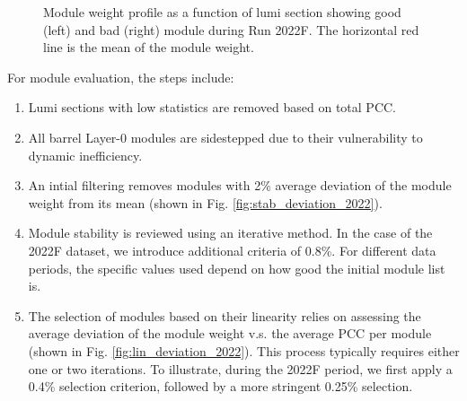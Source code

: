 \begin{figure}[ht]
\begin{subfigure}{0.49\textwidth}
  \label{fig:sub2}
\end{subfigure}
\caption[Good/Bad Module Weight Profile]{Module weight profile as a function of lumi section showing good (left) and bad (right) module during Run 2022F. The horizontal red line is the mean of the module weight.}
\label{fig:test}
\end{figure}



For module evaluation, the steps include:
\begin{enumerate}
    \item Lumi sections with low statistics are removed based on total PCC.
    \item All barrel Layer-0 modules are sidestepped due to their vulnerability to dynamic inefficiency.
    \item An intial filtering removes modules with 2\% average deviation of the module weight from its mean (shown in Fig. \ref{fig:stab_deviation_2022}). %

    \item Module stability is reviewed using an iterative method. In the case of the 2022F dataset, we introduce additional criteria of 0.8\%. For different data periods, the specific values used depend on how good the initial module list is.

    \item The selection of modules based on their linearity relies on assessing the average deviation of the module weight v.s. the average PCC per module (shown in Fig. \ref{fig:lin_deviation_2022}). This process typically requires either one or two iterations. To illustrate, during the 2022F period, we first apply a 0.4\% selection criterion, followed by a more stringent 0.25\% selection.

\end{enumerate}


